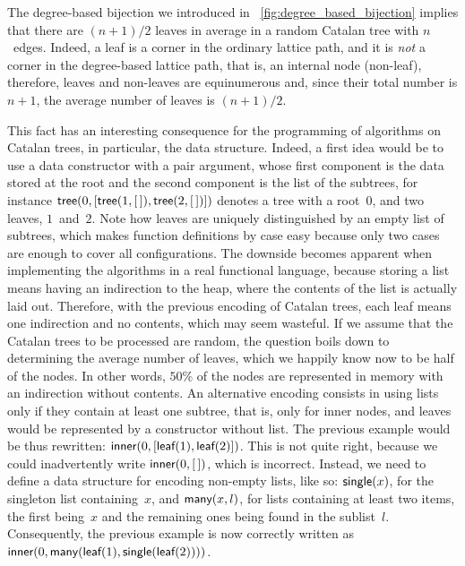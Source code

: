 The degree\hyp{}based bijection we introduced in
\fig~\vref{fig:degree_based_bijection} implies that there are
\((n+1)/2\) leaves in average in a random Catalan tree with
\(n\)~edges. Indeed, a leaf is a corner in the ordinary lattice path,
and it is \emph{not} a corner in the degree\hyp{}based lattice path,
that is, an internal node (non\hyp{}leaf), therefore, leaves and
non\hyp{}leaves are equinumerous and, since their total number is
\(n+1\), the average number of leaves is \((n+1)/2\).

This fact has an interesting consequence for the programming of
algorithms on Catalan trees, in particular, the data
structure. Indeed, a first idea would be to use a data constructor
 with a pair argument, whose first component is the data
stored at the root and the second component is the list of the
subtrees, for instance \(\textsf{tree}(0,[\textsf{tree}(1,[\,]),
\textsf{tree}(2,[\,])])\) denotes a tree with a root~\(0\), and two
leaves, \(1\)~and~\(2\). Note how leaves are uniquely distinguished by
an empty list of subtrees, which makes function definitions by case
easy because only two cases are enough to cover all
configurations. The downside becomes apparent when implementing the
algorithms in a real functional language, because storing a list means
having an indirection to the heap, where the contents of the list is
actually laid out. Therefore, with the previous encoding of Catalan
trees, each leaf means one indirection and no contents, which may seem
wasteful. If we assume that the Catalan trees to be processed are
random, the question boils down to determining the average number of
leaves, which we happily know now to be half of the nodes. In other
words, \(50\%\) of the nodes are represented in memory with an
indirection without contents. An alternative encoding consists in
using lists only if they contain at least one subtree, that is, only
for inner nodes, and leaves would be represented by a constructor
without list. The previous example would be thus rewritten:
\(\textsf{inner}(0,[\textsf{leaf}(1),\textsf{leaf}(2)])\). This is not quite
right, because we could inadvertently write \(\textsf{inner}(0,[\,])\),
which is incorrect. Instead, we need to define a data structure for
encoding non\hyp{}empty lists, like so: \(\textsf{single}(x)\), for the
singleton list containing~\(x\), and \(\textsf{many}(x,l)\), for lists
containing at least two items, the first being~\(x\) and the remaining
ones being found in the sublist~\(l\). Consequently, the previous
example is now correctly written as
\(\textsf{inner}(0,\textsf{many}(\textsf{leaf}(1),\textsf{single}(\textsf{leaf}(2))))\).

